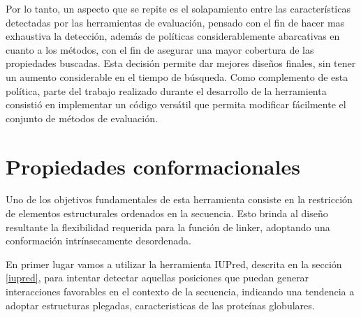 Por lo tanto, un aspecto que se repite es el solapamiento entre las características detectadas por las herramientas de evaluación, pensado con el fin de hacer mas exhaustiva la detección,
además de políticas considerablemente abarcativas en cuanto a los métodos, con el fin de asegurar una mayor cobertura de las propiedades buscadas.
Esta decisión permite dar mejores diseños finales, sin tener un aumento considerable en el tiempo de búsqueda.
Como complemento de esta política, parte del trabajo realizado durante el desarrollo de la herramienta consistió en implementar un código versátil que permita modificar fácilmente el conjunto de métodos de evaluación.





\section{Propiedades conformacionales} \label{propiedadesConformacionales}

Uno de los objetivos fundamentales de esta herramienta consiste en la restricción de elementos estructurales ordenados en la secuencia. 
Esto brinda al diseño resultante la flexibilidad requerida para la función de linker, adoptando una conformación intrínsecamente desordenada. 

En primer lugar vamos a utilizar la herramienta IUPred, descrita en la sección \ref{iupred}, para intentar detectar aquellas posiciones que puedan generar interacciones 
favorables en el contexto de la secuencia, indicando una tendencia a adoptar estructuras plegadas, caracteristicas de las proteínas globulares.



